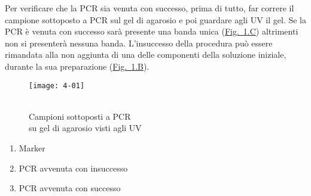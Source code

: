 
Per verificare che la PCR sia venuta con successo, prima di tutto, far correre il campione sottoposto a PCR sul gel di agarosio e poi guardare agli UV il gel. Se la PCR è venuta con successo sarà presente una banda unica (\hyperref[img:4-01]{Fig.~\ref{img:4-01}.C}) altrimenti non si presenterà nessuna banda. L'insuccesso della procedura può essere rimandata alla non aggiunta di una delle componenti della soluzione iniziale, durante la sua preparazione (\hyperref[img:4-01]{Fig.~\ref{img:4-01}.B}).

\begin{minipage}{0.7\textwidth}
	\begin{figure}[H]
		\captionsetup{singlelinecheck=off}
		\centering
		\begin{annotatedFigure}
			{
				\texttt{[image: 4-01]}
			}
		\end{annotatedFigure}
		\caption{\\Campioni sottoposti a PCR\\ su gel di agarosio visti agli UV}\label{img:4-01}
	\end{figure}
\end{minipage}
\begin{minipage}[b]{0.25\textwidth}
	\begin{enumerate}[label=\Alph*)]
		\item Marker
		\item PCR avvenuta con insuccesso
		\item PCR avvenuta con successo
	\end{enumerate}
\end{minipage}
